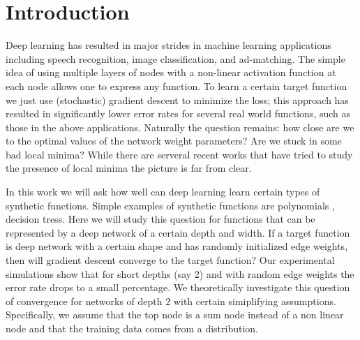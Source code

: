 \section{Introduction}


Deep learning has resulted in major strides in machine learning applications including speech recognition, image classification, and ad-matching. The simple idea of using multiple layers of nodes with a non-linear activation function at each node allows one to express any function.  To learn a certain target function we just use (stochastic) gradient descent to minimize the loss; this approach has resulted in significantly lower error rates for several real world functions, such as those in the above applications. Naturally the question remains: how close are we to the optimal values of the network weight parameters? Are we stuck in some bad local minima? While there are serveral recent works \cite{} that have tried to study the presence of local minima the picture is far from clear.

In this work we will ask how well can deep learning learn certain types of synthetic functions. Simple examples of synthetic functions are polynomials \cite{}, decision tress. Here we will study this question for functions that can be represented by a deep network of a certain depth and width. If a target function is deep network with a certain shape and has randomly initialized edge weights, then will gradient descent converge to the target function? Our experimental simulations show that for short depths (say 2) and with random edge weights the error rate drops to a small percentage. 
We theoretically investigate this question of convergence for networks of depth $2$ with certain simiplifying assumptions. Specifically, we assume that the top node is a sum node instead of a non linear node and that the training data comes from a  distribution. 

